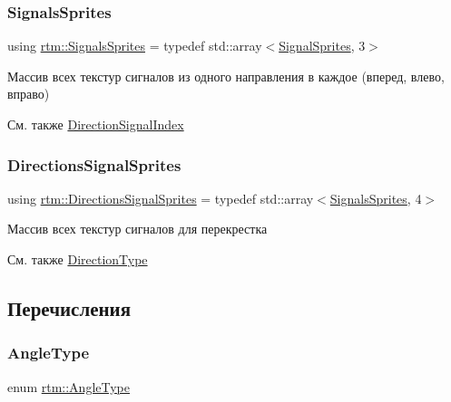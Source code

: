 \subsubsection{\texorpdfstring{Signals\+Sprites}{SignalsSprites}}
{\footnotesize\ttfamily using \hyperlink{namespacertm_a260109b3376dc38095724ee80ed72d8e}{rtm\+::\+Signals\+Sprites} = typedef std\+::array$<$\hyperlink{namespacertm_ab6c6acbd1378bfe5755d77179a7131ff}{Signal\+Sprites}, 3$>$}



Массив всех текстур сигналов из одного направления в каждое (вперед, влево, вправо) 

\begin{DoxySeeAlso}{См. также}
\hyperlink{namespacertm_a27eb93235356cdffe25fe6628e7eff14}{Direction\+Signal\+Index} 
\end{DoxySeeAlso}
\mbox{\label{namespacertm_ac9f276c8ed33ee992eb1a1f04a8254a0}} 
\subsubsection{\texorpdfstring{Directions\+Signal\+Sprites}{DirectionsSignalSprites}}
{\footnotesize\ttfamily using \hyperlink{namespacertm_ac9f276c8ed33ee992eb1a1f04a8254a0}{rtm\+::\+Directions\+Signal\+Sprites} = typedef std\+::array$<$\hyperlink{namespacertm_a260109b3376dc38095724ee80ed72d8e}{Signals\+Sprites}, 4$>$}



Массив всех текстур сигналов для перекрестка 

\begin{DoxySeeAlso}{См. также}
\hyperlink{namespacertm_a57b216f3aeb45041f3461bab08bc3aeb}{Direction\+Type} 
\end{DoxySeeAlso}


\subsection{Перечисления}
\mbox{\label{namespacertm_a69dc82b16a0148c10962caa83d930f89}} 
\subsubsection{\texorpdfstring{Angle\+Type}{AngleType}}
{\footnotesize\ttfamily enum \hyperlink{namespacertm_a69dc82b16a0148c10962caa83d930f89}{rtm\+::\+Angle\+Type}}



